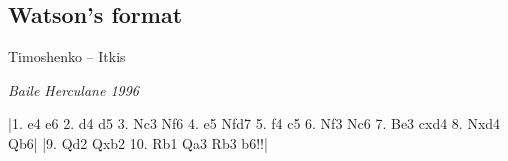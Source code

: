 \documentclass[10pt]{article}
\begin{document}

\newgame
\twocolumn
\renewcommand\afterno{.~}
\renewcommand\iiopent{\par}
\renewcommand\iicloset{\par}
\renewcommand\takes{x}
\renewcommand\beforeb{\the\move.~\dots\ }

\let\ifont\normalfont

\subsection{Watson's format}

\begin{center}
\textsf{Timoshenko -- Itkis}

\textit{Baile Herculane 1996}
\end{center}
\noindent
\newgame
|1. e4 e6 2. d4 d5 3. Nc3 Nf6 4. e5 Nfd7 5. f4 c5 6. Nf3 Nc6 7. Be3 cxd4 8. Nxd4 Qb6|
|9. Qd2 Qxb2 10. Rb1 Qa3 Rb3 b6!!|
\indent
\begin{figure}[h]
\centering
\showboard
\end{figure}

\newgame
\leftdiagramturn
\indent
\begin{figure}[h]
\centering
\showboard
\end{figure}
\end{document}
